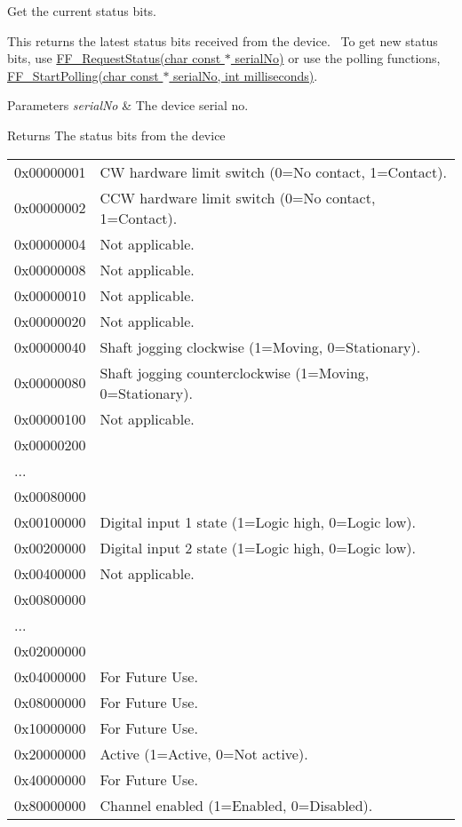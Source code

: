 Get the current status bits. 

This returns the latest status bits received from the device.~\newline
 To get new status bits, use \hyperlink{group___filter_flipper_ga0822ea7134adab515f14531e9a9ca4ed}{F\+F\+\_\+\+Request\+Status(char const $\ast$ serial\+No)} or use the polling functions, \hyperlink{group___filter_flipper_ga612494804c3b7b119be179b436afc666}{F\+F\+\_\+\+Start\+Polling(char const $\ast$ serial\+No, int milliseconds)}. 


\begin{DoxyParams}{Parameters}
{\em serial\+No} & The device serial no. \\
\hline
\end{DoxyParams}
\begin{DoxyReturn}{Returns}
The status bits from the device \tabulinesep=1mm
\begin{longtabu} spread 0pt [c]{*2{|X[-1]}|}
\hline
0x00000001&CW hardware limit switch (0=No contact, 1=Contact). \\
0x00000002&C\+CW hardware limit switch (0=No contact, 1=Contact). \\
0x00000004&Not applicable. \\
0x00000008&Not applicable. \\
0x00000010&Not applicable. \\
0x00000020&Not applicable. \\
0x00000040&Shaft jogging clockwise (1=Moving, 0=Stationary). \\
0x00000080&Shaft jogging counterclockwise (1=Moving, 0=Stationary). \\
0x00000100&Not applicable. \\
0x00000200&\\
...&\\
0x00080000&\\
0x00100000&Digital input 1 state (1=Logic high, 0=Logic low). \\
0x00200000&Digital input 2 state (1=Logic high, 0=Logic low). \\
0x00400000&Not applicable. \\
0x00800000&\\
...&\\
0x02000000&\\
0x04000000&For Future Use. \\
0x08000000&For Future Use. \\
0x10000000&For Future Use. \\
0x20000000&Active (1=Active, 0=Not active). \\
0x40000000&For Future Use. \\
0x80000000&Channel enabled (1=Enabled, 0=Disabled). \\
\end{longtabu}



\end{DoxyReturn}
